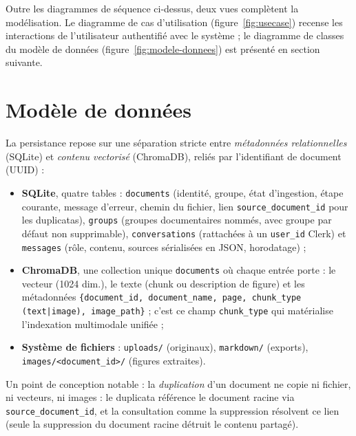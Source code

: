 Outre les diagrammes de séquence ci-dessus, deux vues complètent la modélisation. Le
diagramme de cas d'utilisation (figure~\ref{fig:usecase}) recense les interactions de
l'utilisateur authentifié avec le système ; le diagramme de classes du modèle de données
(figure~\ref{fig:modele-donnees}) est présenté en section suivante.


\section{Modèle de données}
\label{sec:modele-donnees}

La persistance repose sur une séparation stricte entre \emph{métadonnées relationnelles}
(SQLite) et \emph{contenu vectorisé} (ChromaDB), reliés par l'identifiant de document
(UUID) :

\begin{itemize}
  \item \textbf{SQLite}, quatre tables : \texttt{documents} (identité, groupe, état
        d'ingestion, étape courante, message d'erreur, chemin du fichier, lien
        \texttt{source\_document\_id} pour les duplicatas), \texttt{groups} (groupes
        documentaires nommés, avec groupe par défaut non supprimable),
        \texttt{conversations} (rattachées à un \texttt{user\_id} Clerk) et
        \texttt{messages} (rôle, contenu, sources sérialisées en JSON, horodatage) ;
  \item \textbf{ChromaDB}, une collection unique \texttt{documents} où chaque entrée
        porte : le vecteur (1024 dim.), le texte (chunk ou description de figure) et les
        métadonnées \texttt{\{document\_id, document\_name, page, chunk\_type
        (text|image), image\_path\}} ; c'est ce champ \texttt{chunk\_type} qui matérialise
        l'indexation multimodale unifiée ;
  \item \textbf{Système de fichiers} : \texttt{uploads/} (originaux),
        \texttt{markdown/} (exports), \texttt{images/<document\_id>/} (figures extraites).
\end{itemize}

Un point de conception notable : la \emph{duplication} d'un document ne copie ni fichier,
ni vecteurs, ni images : le duplicata référence le document racine via
\texttt{source\_document\_id}, et la consultation comme la suppression résolvent ce lien
(seule la suppression du document racine détruit le contenu partagé).

